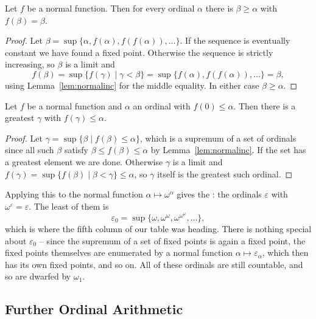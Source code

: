 \documentclass[a4paper]{scrartcl}
\begin{document}
\begin{lemma}\label{lem:fixedpoint}
  Let $f$ be a normal function. Then for every ordinal $\alpha$ there is $\beta \geq \alpha$ with $f(\beta) = \beta$.
\end{lemma}
\begin{proof}
  Let $\beta = \sup\{\alpha, f(\alpha), f(f(\alpha)), \dots\}$. If the sequence is eventually constant we have found a fixed point. Otherwise the sequence is strictly increasing, so $\beta$ is a limit and
  $$f(\beta) = \sup\{f(\gamma) \mid \gamma < \beta\} = \sup\{f(\alpha), f(f(\alpha)), \dots\} = \beta,$$
  using Lemma~\ref{lem:normalinc} for the middle equality. In either case $\beta \geq \alpha$.
\end{proof}

\begin{lemma}\label{lem:normaldivision}
  Let $f$ be a normal function and $\alpha$ an ordinal with $f(0) \leq \alpha$. Then there is a greatest $\gamma$ with $f(\gamma) \leq \alpha$.
\end{lemma}
\begin{proof}
  Let $\gamma = \sup\{\beta \mid f(\beta) \leq \alpha\}$, which is a supremum of a set of ordinals since all such $\beta$ satisfy $\beta \leq f(\beta) \leq \alpha$ by Lemma~\ref{lem:normalinc}. If the set has a greatest element we are done. Otherwise $\gamma$ is a limit and $f(\gamma) = \sup\{f(\beta) \mid \beta < \gamma\} \leq \alpha$, so $\gamma$ itself is the greatest such ordinal.
\end{proof}

Applying this to the normal function $\alpha \mapsto \omega^\alpha$ gives the : the ordinals $\varepsilon$ with $\omega^\varepsilon = \varepsilon$. The least of them is
$$\varepsilon_0 = \sup\{\omega, \omega^\omega, \omega^{\omega^\omega}, \dots\},$$
which is where the fifth column of our table was heading. There is nothing special about $\varepsilon_0$ -- since the supremum of a set of fixed points is again a fixed point, the fixed points themselves are enumerated by a normal function $\alpha \mapsto \varepsilon_\alpha$, which then has its own fixed points, and so on. All of these ordinals are still countable, and so are dwarfed by $\omega_1$.

\subsection{Further Ordinal Arithmetic}
\end{document}
